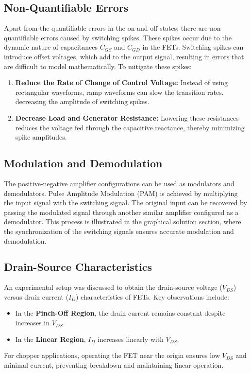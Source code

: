 \subsection*{Non-Quantifiable Errors}
Apart from the quantifiable errors in the on and off states, there are non-quantifiable errors caused by switching spikes. These spikes occur due to the dynamic nature of capacitances \( C_{GS} \) and \( C_{GD} \) in the FETs. Switching spikes can introduce offset voltages, which add to the output signal, resulting in errors that are difficult to model mathematically. To mitigate these spikes:
\begin{enumerate}
    \item \textbf{Reduce the Rate of Change of Control Voltage:} Instead of using rectangular waveforms, ramp waveforms can slow the transition rates, decreasing the amplitude of switching spikes.
    \item \textbf{Decrease Load and Generator Resistance:} Lowering these resistances reduces the voltage fed through the capacitive reactance, thereby minimizing spike amplitudes.
\end{enumerate}

\subsection*{Modulation and Demodulation}
The positive-negative amplifier configurations can be used as modulators and demodulators. Pulse Amplitude Modulation (PAM) is achieved by multiplying the input signal with the switching signal. The original input can be recovered by passing the modulated signal through another similar amplifier configured as a demodulator. This process is illustrated in the graphical solution section, where the synchronization of the switching signals ensures accurate modulation and demodulation.

\subsection*{Drain-Source Characteristics}
An experimental setup was discussed to obtain the drain-source voltage (\( V_{DS} \)) versus drain current (\( I_D \)) characteristics of FETs. Key observations include:
\begin{itemize}
    \item In the \textbf{Pinch-Off Region}, the drain current remains constant despite increases in \( V_{DS} \).
    \item In the \textbf{Linear Region}, \( I_D \) increases linearly with \( V_{DS} \).
\end{itemize}
For chopper applications, operating the FET near the origin ensures low \( V_{DS} \) and minimal current, preventing breakdown and maintaining linear operation.


